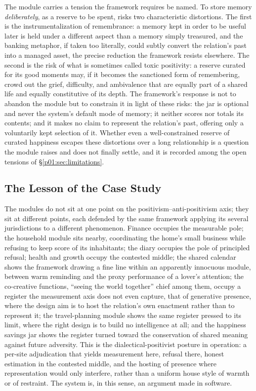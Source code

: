 \documentclass[11pt,a4paper]{article}
\begin{document}
The module carries a tension the framework requires be named. To store memory \emph{deliberately}, as a reserve to be spent, risks two characteristic distortions. The first is the instrumentalization of remembrance: a memory kept in order to be useful later is held under a different aspect than a memory simply treasured, and the banking metaphor, if taken too literally, could subtly convert the relation's past into a managed asset, the precise reduction the framework resists elsewhere. The second is the risk of what is sometimes called toxic positivity: a reserve curated for its good moments may, if it becomes the sanctioned form of remembering, crowd out the grief, difficulty, and ambivalence that are equally part of a shared life and equally constitutive of its depth. The framework's response is not to abandon the module but to constrain it in light of these risks: the jar is optional and never the system's default mode of memory; it neither scores nor totals its contents; and it makes no claim to represent the relation's past, offering only a voluntarily kept selection of it. Whether even a well-constrained reserve of curated happiness escapes these distortions over a long relationship is a question the module raises and does not finally settle, and it is recorded among the open tensions of §\ref{p01:sec:limitations}.

\subsection{The Lesson of the Case Study}

The modules do not sit at one point on the positivism--anti-positivism axis; they sit at different points, each defended by the same framework applying its several jurisdictions to a different phenomenon. Finance occupies the measurable pole; the household module sits nearby, coordinating the home's small business while refusing to keep score of its inhabitants; the diary occupies the pole of principled refusal; health and growth occupy the contested middle; the shared calendar shows the framework drawing a fine line within an apparently innocuous module, between warm reminding and the proxy performance of a lover's attention; the co-creative functions, ``seeing the world together'' chief among them, occupy a register the measurement axis does not even capture, that of generative presence, where the design aim is to host the relation's own enactment rather than to represent it; the travel-planning module shows the same register pressed to its limit, where the right design is to build no intelligence at all; and the happiness savings jar shows the register turned toward the conservation of shared meaning against future adversity. This is the dialectical-positivist posture in operation: a per-site adjudication that yields measurement here, refusal there, honest estimation in the contested middle, and the hosting of presence where representation would only interfere, rather than a uniform house style of warmth or of restraint. The system is, in this sense, an argument made in software.
\end{document}
